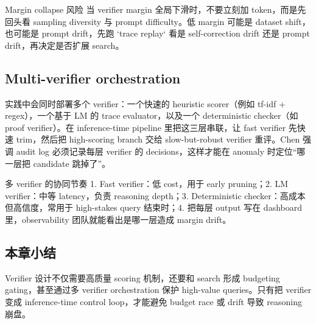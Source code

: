 \begin{warningbox}{Margin collapse 风险}
当 verifier margin 全局下滑时，不要立刻加 token，而是先回头看 sampling diversity 与 prompt difficulty。低 margin 可能是 dataset shift，也可能是 prompt drift，先跑 `trace replay` 看是 self-correction drift 还是 prompt drift，再决定是否扩展 search。
\end{warningbox}

\subsection{Multi-verifier orchestration}
实践中会同时部署多个 verifier：一个快速的 heuristic scorer（例如 tf-idf + regex），一个基于 LM 的 trace evaluator，以及一个 deterministic checker（如 proof verifier）。在 inference-time pipeline 里把这三层串联，让 fast verifier 先快速 trim，然后把 high-scoring branch 交给 slow-but-robust verifier 重评。Chen 强调 audit log 必须记录每层 verifier 的 decisions，这样才能在 anomaly 时定位“哪一层把 candidate 跳掉了”。

\begin{knowledgebox}{多 verifier 的协同节奏}
1. Fast verifier：低 cost，用于 early pruning；2. LM verifier：中等 latency，负责 reasoning depth；3. Deterministic checker：高成本但高信度，常用于 high-stakes query 结束时；4. 把每层 output 写在 dashboard 里，observability 团队就能看出是哪一层造成 margin drift。
\end{knowledgebox}

\subsection{本章小结}
Verifier 设计不仅需要高质量 scoring 机制，还要和 search 形成 budgeting gating，甚至通过多 verifier orchestration 保护 high-value queries。只有把 verifier 变成 inference-time control loop，才能避免 budget race 或 drift 导致 reasoning 崩盘。

